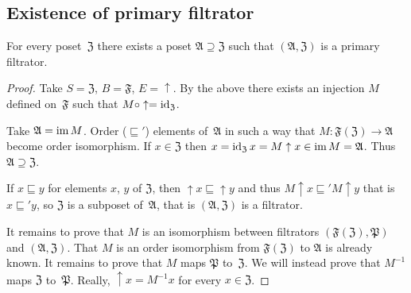 \subsection{Existence of primary filtrator}
\begin{thm}
For every poset~$\mathfrak{Z}$ there exists a poset $\mathfrak{A}\supseteq\mathfrak{Z}$
such that $(\mathfrak{A},\mathfrak{Z})$ is a primary filtrator.\end{thm}
\begin{proof}
Take $S=\mathfrak{Z}$, $B=\mathfrak{F}$, $E=\uparrow$. By the above
there exists an injection $M$ defined on~$\mathfrak{F}$ such that
$M\circ\uparrow=\operatorname{id}_{\mathfrak{Z}}$.

Take $\mathfrak{A}=\operatorname{im} M$. Order ($\sqsubseteq'$) elements of~$\mathfrak{A}$
in such a way that $M:\mathfrak{F}(\mathfrak{Z})\rightarrow\mathfrak{A}$
become order isomorphism. If $x\in\mathfrak{Z}$ then $x=\operatorname{id}_{\mathfrak{Z}}x=M\uparrow x\in\operatorname{im} M=\mathfrak{A}$.
Thus $\mathfrak{A}\supseteq\mathfrak{Z}$.

If $x\sqsubseteq y$ for elements $x$, $y$ of $\mathfrak{Z}$, then
$\uparrow x\sqsubseteq\uparrow y$ and thus $M\uparrow x\sqsubseteq'M\uparrow y$
that is $x\sqsubseteq'y$, so $\mathfrak{Z}$ is a subposet of~$\mathfrak{A}$,
that is $(\mathfrak{A},\mathfrak{Z})$ is a filtrator.

It remains to prove that $M$ is an isomorphism between filtrators
$(\mathfrak{F}(\mathfrak{Z}),\mathfrak{P})$ and $(\mathfrak{A},\mathfrak{Z})$.
That $M$ is an order isomorphism from $\mathfrak{F}(\mathfrak{Z})$
to $\mathfrak{A}$ is already known. It remains to prove that $M$
maps $\mathfrak{P}$ to~$\mathfrak{Z}$. We will instead prove that
$M^{-1}$ maps $\mathfrak{Z}$ to~$\mathfrak{P}$. Really, $\uparrow x=M^{-1}x$ for every $x\in\mathfrak{Z}$.\end{proof}

